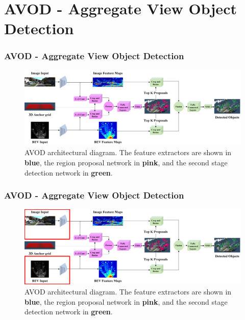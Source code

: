 \documentclass[10pt,fleqn,unknownkeysallowed]{beamer}
\begin{document}
\section{AVOD - Aggregate View Object Detection}
\begin{frame}
	\frametitle{AVOD - Aggregate View Object Detection}
	\begin{figure}
		\begin{center}
			\includegraphics[width=115mm]{images/Meta-Architecture}
		\end{center}
	\caption{AVOD architectural diagram. The feature extractors are shown in \textbf{blue}, the region proposal network in \textbf{pink}, and the second stage detection network in \textbf{green}.}
	\end{figure}
\end{frame}

\begin{frame}
	\frametitle{AVOD - Aggregate View Object Detection}
	\begin{figure}
		\begin{center}
			\includegraphics[width=115mm]{images/Meta-Architecture_1}
		\end{center}
		\caption{AVOD architectural diagram. The feature extractors are shown in \textbf{blue}, the region proposal network in \textbf{pink}, and the second stage detection network in \textbf{green}.}
	\end{figure}
\end{frame}
\end{document}
